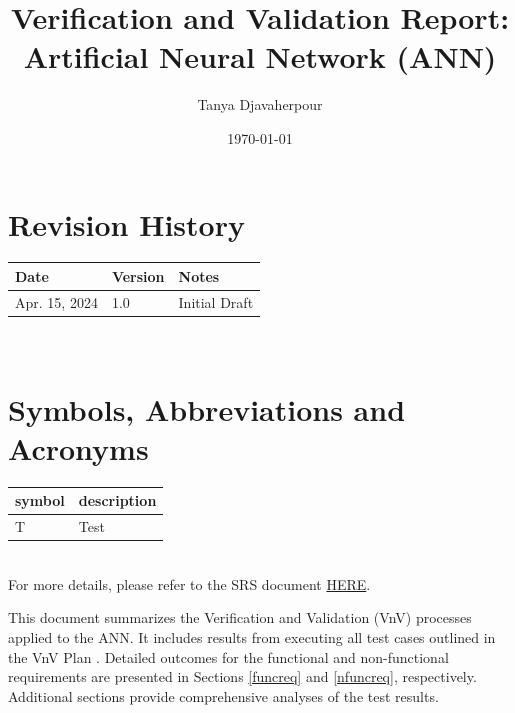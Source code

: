 \documentclass[12pt, titlepage]{article}
\begin{document}
\title{Verification and Validation Report: Artificial Neural Network (ANN)} 
\author{Tanya Djavaherpour}
\date{\today}
	
\maketitle


\section{Revision History}

\begin{tabularx}{\textwidth}{p{3cm}p{2cm}X}
\toprule {\bf Date} & {\bf Version} & {\bf Notes}\\
\midrule
Apr. 15, 2024 & 1.0 & Initial Draft\\
\bottomrule
\end{tabularx}

~\newpage

\section{Symbols, Abbreviations and Acronyms}

\renewcommand{\arraystretch}{1.2}
\begin{tabular}{l l} 
  \toprule		
  \textbf{symbol} & \textbf{description}\\
  \midrule 
  T & Test\\
  \bottomrule
\end{tabular}\\

For more details, please refer to the SRS document \citep{SRS} 
\href{https://github.com/tanya-jp/ANN-CAS741/blob/main/docs/SRS/SRS.pdf}
{HERE}.


\newpage

\tableofcontents

\listoftables %

\listoffigures %

\newpage


This document summarizes the Verification and Validation (VnV) 
processes applied to the ANN. It includes results from executing all 
test cases outlined in the VnV Plan \citep{VnVPlan}. Detailed outcomes for 
the functional and non-functional requirements are presented in Sections 
\ref{funcreq} and \ref{nfuncreq}, respectively. 
Additional sections provide comprehensive analyses of the test results.
\end{document}
